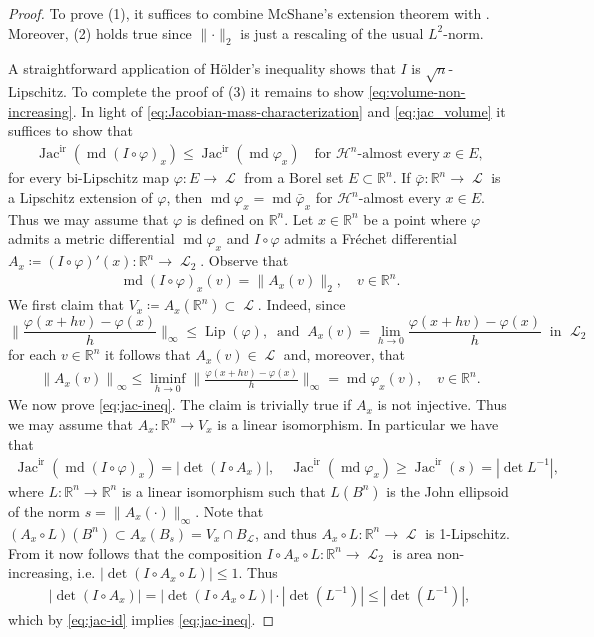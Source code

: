 \documentclass[reqno]{amsart}
\numberwithin{equation}{section}
\newcommand{\R}{\mathbb{R}}
\newcommand{\Ha}{\mathcal{H}}
\newcommand{\Lip}{\operatorname{Lip}}
\newcommand{\inv}{^{-1}}
\newcommand{\Jac}{\operatorname{Jac}}
\newcommand{\md}{\operatorname{md}}
\newcommand{\norm}[1]{\lVert#1\rVert}
\DeclareMathOperator{\Ell}{\mathscr{L}}
\DeclareMathOperator{\ir}{ir}
\begin{document}
\begin{proof}
To prove (1), it suffices to combine McShane's extension theorem with \cite[Lemma~5.1]{bi10}. Moreover, (2) holds true since $\norm{\cdot}_2$ is just a rescaling of the usual $L^2$-norm.

A straightforward application of Hölder's inequality shows that $I$ is $\sqrt{n}$-Lipschitz. To complete the proof of (3) it remains to show \eqref{eq:volume-non-increasing}. In light of  \eqref{eq:Jacobian-mass-characterization} and \eqref{eq:jac_volume} it suffices to show that
\begin{align}\label{eq:jac-ineq}
\Jac^{\ir}(\md(I\circ\varphi)_x)\le \Jac^{\ir}(\md\varphi_x)\quad \text{for \(\Ha^n\)-almost every}\ x\in E,
\end{align}
for every bi-Lipschitz map $\varphi:E\to \Ell$ from a Borel set $E\subset \R^n$. If $\bar\varphi:\R^n\to \Ell$ is a Lipschitz extension of $\varphi$, then $\md\varphi_x=\md\bar\varphi_x$ for \(\Ha^n\)-almost every $x\in E$. Thus we may assume that $\varphi$ is defined on $\R^n$. Let $x\in \R^n$ be a point where $\varphi$ admits a metric differential $\md\varphi_x$ and $I\circ\varphi$ admits a Fréchet differential $A_x\coloneqq (I\circ\varphi)'(x):\R^n\to \Ell_2$. Observe that 
\begin{align*}
 \md(I\circ\varphi)_x(v)=\|A_x(v)\|_2,\quad v\in \R^n.
\end{align*}
We first claim that $V_x\coloneqq A_x(\R^n)\subset \Ell$. Indeed, since 
\[
\Big\|\frac{\varphi(x+hv)-\varphi(x)}{h}\Big\|_\infty\le \Lip(\varphi),\ \textrm{ and }\ A_x(v)=\lim_{h\to 0}\frac{\varphi(x+hv)-\varphi(x)}{h}\ \textrm{ in }\Ell_2
\]
 for each $v\in\R^n$ it follows that $A_x(v)\in\Ell$ and, moreover, that 
\begin{align*}
    \left\|A_x(v)\right\|_\infty \le \liminf_{h\to 0}\Big\|\frac{\varphi(x+hv)-\varphi(x)}{h}\Big\|_\infty=\md\varphi_x(v),\quad v\in \R^n.
\end{align*}
We now prove \eqref{eq:jac-ineq}. The claim is trivially true if $A_x$ is not injective. Thus we may assume that $A_x:\R^n\to V_x$ is a linear isomorphism. In particular we have that
\begin{align}\label{eq:jac-id}
\Jac^{\ir}(\md(I\circ\varphi)_x)=|\det (I\circ A_x)|,\quad \Jac^{\ir} (\md\varphi_x)\ge \Jac^{\ir} (s)=|\det{L\inv}|,
\end{align}
where $L\colon\R^n\to \R^n$ is a linear isomorphism such that $L(B^n)$ is the John ellipsoid of the norm $s=\|A_x(\cdot)\|_\infty$. Note that $(A_x\circ L)(B^n)\subset A_x(B_s)=V_x\cap B_{\Ell}$, and thus $A_x\circ L:\R^n\to \Ell$ is 1-Lipschitz. From \cite[Lemma ~6.1]{bi10} it now follows that the composition $I\circ A_x\circ L:\R^n\to \Ell_2$ is area non-increasing, i.e. $|\det(I\circ A_x\circ L)|\le 1$. Thus
\begin{align*}
|\det(I\circ A_x)|=|\det(I\circ A_x\circ L)|\cdot|\det(L\inv)|\le |\det(L\inv)|,
\end{align*}
which by \eqref{eq:jac-id} implies \eqref{eq:jac-ineq}. 


\end{proof}
\end{document}
